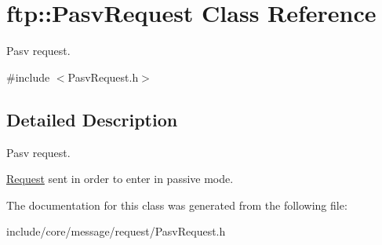 \hypertarget{classftp_1_1_pasv_request}{\section{ftp\-:\-:Pasv\-Request Class Reference}
\label{classftp_1_1_pasv_request}
}


Pasv request.  




{\ttfamily \#include $<$Pasv\-Request.\-h$>$}



\subsection{Detailed Description}
Pasv request. 

\hyperlink{classftp_1_1_request}{Request} sent in order to enter in passive mode. 

The documentation for this class was generated from the following file\-:\begin{DoxyCompactItemize}
\item 
include/core/message/request/Pasv\-Request.\-h\end{DoxyCompactItemize}
